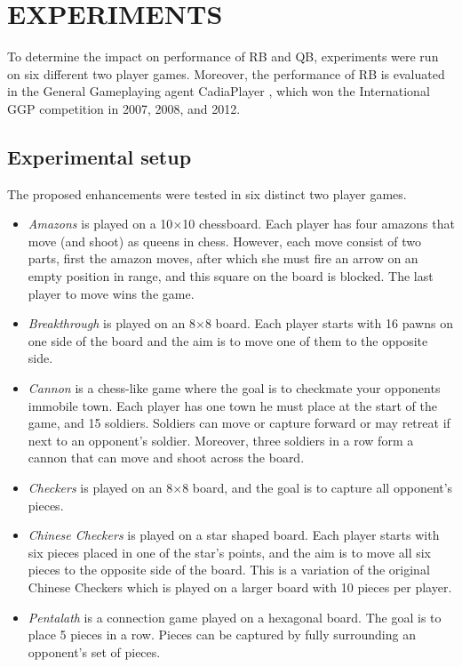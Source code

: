\documentclass{ecai2014}
\begin{document}
\section{EXPERIMENTS}
\label{sec:experiments}
To determine the impact on performance of RB and QB, experiments were run on six different two player games. Moreover, the performance of RB is evaluated in the General Gameplaying agent {\sc CadiaPlayer} \cite{bjornsson2009cadiaplayer}, which won the International GGP competition in 2007, 2008, and 2012.

\subsection{Experimental setup}
\label{subsec:expsetup}
The proposed enhancements were tested in six distinct two player games.
\begin{itemize}
\item \emph{Amazons} is played on a 10$\times$10 chessboard. Each player has four amazons that move (and shoot) as queens in chess. However, each move consist of two parts, first the amazon moves, after which she must fire an arrow on an empty position in range, and this square on the board is blocked. The last player to move wins the game.
\item \emph{Breakthrough} is played on an 8$\times$8 board. Each player starts with 16 pawns on one side of the board and the aim is to move one of them to the opposite side.
\item \emph{Cannon} is a chess-like game where the goal is to checkmate your opponents immobile town. Each player has one town he must place at the start of the game, and 15 soldiers. Soldiers can move or capture forward or may retreat if next to an opponent's soldier. Moreover, three soldiers in a row form a cannon that can move and shoot across the board.
\item \emph{Checkers} is played on an 8$\times$8 board, and the goal is to capture all opponent's pieces.
\item \emph{Chinese Checkers} is played on a star shaped board. Each player starts with six pieces placed in one of the star's points, and the aim is to move all six pieces to the opposite side of the board. This is a variation of the original Chinese Checkers which is played on a larger board with 10 pieces per player.
\item \emph{Pentalath} is a connection game played on a hexagonal board. The goal is to place 5 pieces in a row. Pieces can be captured by fully surrounding an opponent's set of pieces.
\end{itemize}
\end{document}
